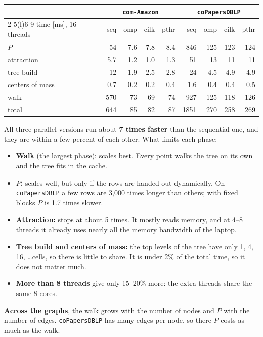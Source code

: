 \documentclass[11pt,a4paper]{article}
\newcommand{\code}[1]{\texttt{#1}}
\begin{document}
\begin{center}
\small
\begin{tabular}{lrrrr rrrr}
\toprule
 & \multicolumn{4}{c}{\code{com-Amazon}} & \multicolumn{4}{c}{\code{coPapersDBLP}} \\
\cmidrule(lr){2-5}\cmidrule(l){6-9}
time [ms], 16 threads & seq & omp & cilk & pthr & seq & omp & cilk & pthr \\
\midrule
$P$         & 54  & 7.6 & 7.8 & 8.4 & 846  & 125 & 123 & 124 \\
attraction  & 5.7 & 1.2 & 1.0 & 1.3 & 51   & 13  & 11  & 11  \\
tree build  & 12  & 1.9 & 2.5 & 2.8 & 24   & 4.5 & 4.9 & 4.9 \\
centers of mass & 0.7 & 0.2 & 0.2 & 0.4 & 1.6 & 0.4 & 0.4 & 0.5 \\
walk        & 570 & 73  & 69  & 74  & 927  & 125 & 118 & 126 \\
\midrule
total       & 644 & 85  & 82  & 87  & 1851 & 270 & 258 & 269 \\
\bottomrule
\end{tabular}
\end{center}

All three parallel versions run about \textbf{7 times faster} than the
sequential one, and they are within a few percent of each other.
What limits each phase:

\begin{itemize}
  \item \textbf{Walk} (the largest phase): scales best. Every point
    walks the tree on its own and the tree fits in the cache.
  \item \textbf{$P$:} scales well, but only if the rows are handed out
    dynamically. On \code{coPapersDBLP} a few rows are 3{,}000 times
    longer than others; with fixed blocks $P$ is 1.7 times slower.
  \item \textbf{Attraction:} stops at about 5 times. It mostly reads
    memory, and at 4--8 threads it already uses nearly all the memory
    bandwidth of the laptop.
  \item \textbf{Tree build and centers of mass:} the top levels of the tree have only 1, 4,
    16, \dots cells, so there is little to share. It is under 2\% of the
    total time, so it does not matter much.
  \item \textbf{More than 8 threads} give only 15--20\% more: the extra
    threads share the same 8 cores.
\end{itemize}

\textbf{Across the graphs}, the walk grows with the number of nodes and
$P$ with the number of edges. \code{coPapersDBLP} has many edges per node,
so there $P$ costs as much as the walk.
\end{document}
